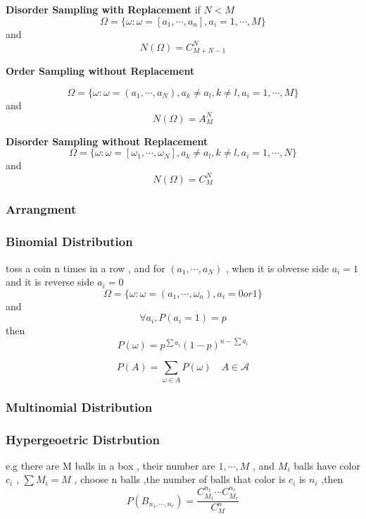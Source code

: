 \documentclass{ctexart}
\begin{document}
\textbf{Disorder Sampling with Replacement}
if \(N<M\)
\[\Omega =\{ \omega : \omega =[a_1,\cdots ,a_n],a_i=1, \cdots ,M\}\]
and 
\[N(\Omega)=C_{M+N-1}^{N}\]

\vspace{12 pt}
\textbf{Order Sampling without Replacement}

\[\Omega =\{\omega : \omega =(a_1 ,\cdots , a_N),a_k\neq a_l,k\neq l,a_i=1,\cdots ,M \}\]
and 
\[N(\Omega)=A^{N}_{M}\]

\textbf{Disorder Sampling without Replacement}
\[\Omega =\{\omega : \omega =[\omega_1 , \cdots , \omega_N], a_k\neq a_l , k\neq l , a_i=1, \cdots ,N\}\]
and
\[N(\Omega)=C^{N}_{M}\]

\vspace{12 pt}
\subsubsection{Arrangment}


\vspace{12 pt}
\subsubsection{Binomial Distribution}
toss a coin n times in a row , and for \((a_1,\cdots ,a_N)\) , when it is obverse side \(a_i=1\) and it is reverse side \(a_i=0\)
\[\Omega =\{\omega :\omega =(a_1 ,\cdots ,\omega_n),a_i=0 or 1\}\]
and
\[\forall a_i ,P(a_i=1)=p\]
then
\[P(\omega )= p^{\sum a_i}(1-p)^{n-\sum{a_i}}\]

\[P(A)=\sum_{\omega \in A}{P(\omega )}\quad A\in \mathscr{A}\]

\vspace{12 pt}
\subsubsection{Multinomial Distribution}


\vspace{12 pt}
\subsubsection{Hypergeoetric Distrbution}
e.g there are M balls in a box , their number are \(1,\cdots ,M\) , and \(M_i\) balls have color \(c_i\) , \(\sum{M_i}=M\) , choose n balls ,the number of balls that color is \(c_i\) is \(n_i\) ,then
\[P(B_{n_1,\cdots ,n_r})=\frac{C^{n_1}_{M_1}\cdots C^{n_r}_{M_r}}{C^{n}_{M}}\]

\vspace{12 pt}
\end{document}
